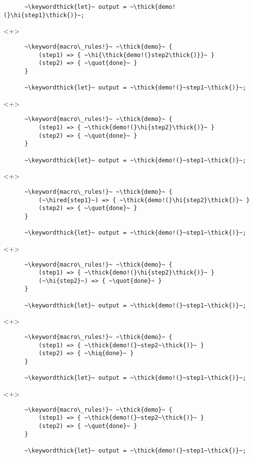 \documentclass[usepdftitle=false]{beamer}
\newcommand{\thick}[1]{\contourlength{0.16pt}\contour[10]{black}{#1}}
\newcommand{\slantbox}[2][.5]
  {%
    \mbox
      {%
        \sbox{\foobox}{#2}%
        \hskip\wd\foobox
        \pdfsave
        \pdfsetmatrix{1 0 #1 1}%
        \llap{\usebox{\foobox}}%
        \pdfrestore
      }%
  }
\newcommand{\backslantbox}[2][.5]
  {%
    \mbox
      {%
        \sbox{\foobox}{#2}%
        \hskip\wd\foobox
        \pdfsave
        \pdfsetmatrix{-1 0 #1 1}%
        \llap{\usebox{\foobox}}%
        \pdfrestore
      }%
  }
\newcommand{\hi}[1]{%
\tikz[baseline=(A.base)]
 \node[highlighting=yellowbg,inner sep=0pt,text depth=0pt] (A) {#1};%
}
\newcommand{\hired}[1]{%
\tikz[baseline=(A.base)]
 \node[highlighting=redish!50,inner sep=0pt,text depth=0pt] (A) {#1};%
}
\newcommand{\openquote}{\backslantbox[.2]{\hspace{11pt}''\hspace{-11pt}}}
\newcommand{\closequote}{\slantbox[-.2]{\hspace{2pt}''\hspace{-2pt}}}
\newcommand{\hiq}[1]{\hi{\openquote#1\closequote}}
\newcommand{\blackquote}[1]{\openquote#1\closequote}
\newcommand{\quot}[1]{{\color{redish}\blackquote{#1}}}
\newcommand{\keyword}[1]{\color{greenish}#1}
\newcommand{\keywordthick}[1]{\color{greenish}\contourlength{0.20pt}\contour[10]{greenish}{#1}}
\begin{document}
\begin{frame}[fragile]
\begin{onlyenv}
\begin{verbatim}
      ~\keywordthick{let}~ output = ~\thick{demo!(}\hi{step1}\thick{)}~;
    \end{verbatim}
  \end{onlyenv}
  \begin{onlyenv}<+>
    \begin{verbatim}
      ~\keyword{macro\_rules!}~ ~\thick{demo}~ {
          (step1) => { ~\hi{\thick{demo!(}step2\thick{)}}~ }
          (step2) => { ~\quot{done}~ }
      }

      ~\keywordthick{let}~ output = ~\thick{demo!(}~step1~\thick{)}~;
    \end{verbatim}
  \end{onlyenv}
  \begin{onlyenv}<+>
    \begin{verbatim}
      ~\keyword{macro\_rules!}~ ~\thick{demo}~ {
          (step1) => { ~\thick{demo!(}\hi{step2}\thick{)}~ }
          (step2) => { ~\quot{done}~ }
      }

      ~\keywordthick{let}~ output = ~\thick{demo!(}~step1~\thick{)}~;
    \end{verbatim}
  \end{onlyenv}
  \begin{onlyenv}<+>
    \begin{verbatim}
      ~\keyword{macro\_rules!}~ ~\thick{demo}~ {
          (~\hired{step1}~) => { ~\thick{demo!(}\hi{step2}\thick{)}~ }
          (step2) => { ~\quot{done}~ }
      }

      ~\keywordthick{let}~ output = ~\thick{demo!(}~step1~\thick{)}~;
    \end{verbatim}
  \end{onlyenv}
  \begin{onlyenv}<+>
    \begin{verbatim}
      ~\keyword{macro\_rules!}~ ~\thick{demo}~ {
          (step1) => { ~\thick{demo!(}\hi{step2}\thick{)}~ }
          (~\hi{step2}~) => { ~\quot{done}~ }
      }

      ~\keywordthick{let}~ output = ~\thick{demo!(}~step1~\thick{)}~;
    \end{verbatim}
  \end{onlyenv}
  \begin{onlyenv}<+>
    \begin{verbatim}
      ~\keyword{macro\_rules!}~ ~\thick{demo}~ {
          (step1) => { ~\thick{demo!(}~step2~\thick{)}~ }
          (step2) => { ~\hiq{done}~ }
      }

      ~\keywordthick{let}~ output = ~\thick{demo!(}~step1~\thick{)}~;
    \end{verbatim}
  \end{onlyenv}
  \begin{onlyenv}<+>
    \begin{verbatim}
      ~\keyword{macro\_rules!}~ ~\thick{demo}~ {
          (step1) => { ~\thick{demo!(}~step2~\thick{)}~ }
          (step2) => { ~\quot{done}~ }
      }

      ~\keywordthick{let}~ output = ~\thick{demo!(}~step1~\thick{)}~;
    \end{verbatim}
  \end{onlyenv}
\end{frame}
\end{document}
